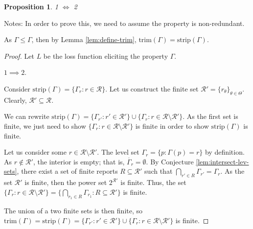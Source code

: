 \documentclass[12pt]{article}
\newcommand{\E}{\mathbb{E}}
\newcommand{\R}{\mathcal{R}}
\newcommand{\inter}[1]{\mathring{#1}}%
\newcommand{\trim}{\mathrm{trim}}
\newcommand{\strip}{\text{strip}}
\DeclareMathOperator*{\argmin}{arg\,min}
\newtheorem{proposition}{Proposition}
\begin{document}
\begin{proposition}\label{prop:optimal-reports-per-level-set}
1 $\iff$ 2
\end{proposition}



Notes:
In order to prove this, we need to assume the property is non-redundant.

As $\Gamma \leq \Gamma$, then by Lemma \ref{lem:define-trim}, $\trim(\Gamma) = \strip(\Gamma)$.


\begin{proof}
Let $L$ be the loss function eliciting the property $\Gamma$.

$1 \implies 2$. 


Consider $\strip(\Gamma) = \{\Gamma_r : r \in \R \}$.
Let us construct the finite set $\R' = \{r_\theta \}_{\theta \in \Theta}$.
Clearly, $\R' \subseteq \R$.

We can rewrite $\strip(\Gamma) = \{\Gamma_{r'} : r' \in \R' \} \cup \{\Gamma_{r} : r \in \R \setminus \R' \}$.
As the first set is finite, we just need to show $\{\Gamma_{r} : r \in \R \setminus \R' \}$ is finite in order to show $\strip(\Gamma)$ is finite.

Let us consider some $r\in\R \setminus \R'$.
The level set $\Gamma_r = \{p : \Gamma(p) = r\}$ by definition.
As $r \not\in \R'$, the interior is empty; that is, $\inter{\Gamma_r} = \emptyset$.
By Conjecture \ref{lem:intersect-lev-sets}, there exist a set of finite reports $R \subseteq \R'$ such that $\bigcap_{r'\in R} \Gamma_{r'} = \Gamma_r$.
As the set $\R'$ is finite, then the power set $2^{\R'}$ is finite.
Thus, the set $\{ \Gamma_r : r \in \R \setminus \R' \} =  \{ \bigcap_{r_1 \in R} \Gamma_{r_1} : R \subseteq \R' \}$ is finite.


The union of a two finite sets is then finite, so $\trim(\Gamma) = \strip(\Gamma) = \{ \Gamma_{r'} : r' \in \R' \} \cup \{ \Gamma_r : r \in \R \setminus \R' \}$ is finite.





\end{proof}
\end{document}
